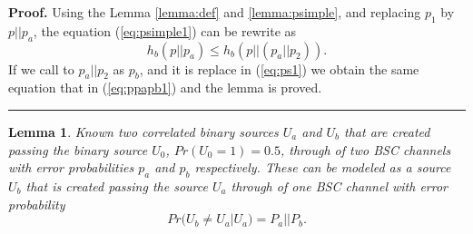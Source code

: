 \documentclass[a4paper,10pt]{article}
\newtheorem{mylemma}[mytheorem]{Lemma}
\newenvironment{myproof}[1][Proof]{\textbf{#1.} }{\ \rule{0.5em}{0.5em}}
\begin{document}
\begin{myproof}
\label{proof:ppapb} 
Using the Lemma \ref{lemma:def} and \ref{lemma:psimple}, and replacing 
$p_1$ by $p || p_a$, the equation (\ref{eq:psimple1}) can be rewrite as 
\begin{equation} \label{eq:ps1}
h_b(p || p_a) \leq h_b(p|| (p_a||p_2)).
\end{equation}
If we call to $p_a||p_2$ as $p_b$, and it is replace in (\ref{eq:ps1}) we obtain
the same equation that in (\ref{eq:ppapb1}) and the lemma is proved.
\end{myproof}
\begin{mdframed}[style=MDFStyGrayScreen]
\begin{mylemma}
\label{lemma:twoparbsc}
Known two correlated binary sources $U_a$ and $U_b$ that are created passing 
the binary source $U_0$, $Pr(U_0=1)=0.5$, through of two BSC channels with  
error probabilities $p_a$ and $p_b$ respectively. These can be modeled as a 
source $U_b$ that is created passing the source $U_a$ through of one BSC 
channel with  error probability 
\begin{equation} \label{eq:tpb0}
Pr(U_b \neq U_a|U_a)=P_a || P_b.
\end{equation}
\end{mylemma}
\end{mdframed}
\end{document}

